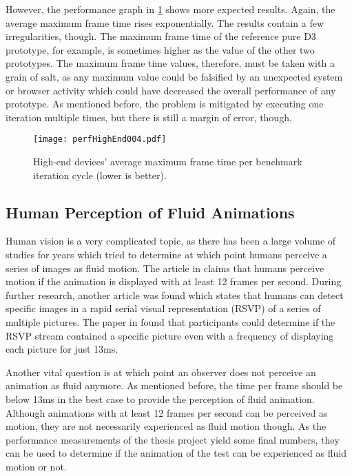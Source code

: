 However, the performance graph in \ref{fig:perfHighEnd004} shows more expected results. Again, the average maximum frame time rises exponentially. The results contain a few irregularities, though. The maximum frame time of the reference pure D3 prototype, for example, is sometimes higher as the value of the other two prototypes. The maximum frame time values, therefore, must be taken with a grain of salt, as any maximum value could be falsified by an unexpected system or browser activity which could have decreased the overall performance of any prototype. As mentioned before, the problem is mitigated by executing one iteration multiple times, but there is still a margin of error, though.

\begin{figure}
\centering
\texttt{[image: perfHighEnd004.pdf]}
\caption{High-end devices' average maximum frame time per benchmark iteration cycle (lower is better).}
\label{fig:perfHighEnd004}
\end{figure}

\subsection{Human Perception of Fluid Animations}
\label{sub:humanPerception}


Human vision is a very complicated topic, as there has been a large volume of studies for years which tried to determine at which point humans perceive a series of images as fluid motion. The article in \cite{RestorationOfMotionPictureFilm} claims that humans perceive motion if the animation is displayed with at least 12 frames per second. During further research, another article was found which states that humans can detect specific images in a rapid serial visual representation (RSVP) of a series of multiple pictures. The paper in \cite{Potter2014} found that participants could determine if the RSVP stream contained a specific picture even with a frequency of displaying each picture for just 13ms. 

Another vital question is at which point an observer does not perceive an animation as fluid anymore. As mentioned before, the time per frame should be below 13ms in the best case to provide the perception of fluid animation. Although animations with at least 12 frames per second can be perceived as motion, they are not necessarily experienced as fluid motion though. As the performance measurements of the thesis project yield some final numbers, they can be used to determine if the animation of the test can be experienced as fluid motion or not.

